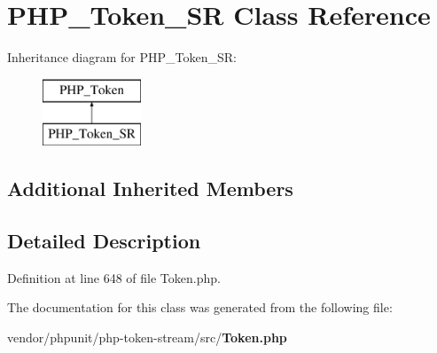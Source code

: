 \section{P\+H\+P\+\_\+\+Token\+\_\+\+S\+R Class Reference}
\label{class_p_h_p___token___s_r}
Inheritance diagram for P\+H\+P\+\_\+\+Token\+\_\+\+S\+R\+:\begin{figure}[H]
\begin{center}
\leavevmode
\includegraphics[height=2.000000cm]{class_p_h_p___token___s_r}
\end{center}
\end{figure}
\subsection*{Additional Inherited Members}


\subsection{Detailed Description}


Definition at line 648 of file Token.\+php.



The documentation for this class was generated from the following file\+:\begin{DoxyCompactItemize}
\item 
vendor/phpunit/php-\/token-\/stream/src/{\bf Token.\+php}\end{DoxyCompactItemize}
